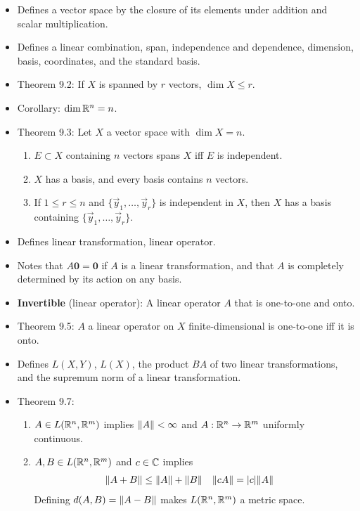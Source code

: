 \documentclass[../notes.tex]{subfiles}
\begin{document}
\begin{itemize}
    \item {}Defines a vector space by the closure of its elements under addition and scalar multiplication.
    \item Defines a linear combination, span, independence and dependence, dimension, basis, coordinates, and the standard basis.
    \item Theorem 9.2: If $X$ is spanned by $r$ vectors, $\dim X\leq r$.
    \item Corollary: $\dim\mathbb{R}^n=n$.
    \item Theorem 9.3: Let $X$ a vector space with $\dim X=n$.
    \begin{enumerate}[label={(\alph*)}]
        \item $E\subset X$ containing $n$ vectors spans $X$ iff $E$ is independent.
        \item $X$ has a basis, and every basis contains $n$ vectors.
        \item If $1\leq r\leq n$ and $\{\vec{y}_1,\dots,\vec{y}_r\}$ is independent in $X$, then $X$ has a basis containing $\{\vec{y}_1,\dots,\vec{y}_r\}$.
    \end{enumerate}
    \item Defines linear transformation, linear operator.
    \item Notes that $A\bm{0}=\bm{0}$ if $A$ is a linear transformation, and that $A$ is completely determined by its action on any basis.
    \item \textbf{Invertible} (linear operator): A linear operator $A$ that is one-to-one and onto.
    \item Theorem 9.5: $A$ a linear operator on $X$ finite-dimensional is one-to-one iff it is onto.
    \item Defines $L(X,Y)$, $L(X)$, the product $BA$ of two linear transformations, and the supremum norm of a linear transformation.
    \item Theorem 9.7:
    \begin{enumerate}[label={(\alph*)}]
        \item $A\in L(\mathbb{R}^n,\mathbb{R}^m)$ implies $\norm{A}<\infty$ and $A:\mathbb{R}^n\to\mathbb{R}^m$ uniformly continuous.
        \item $A,B\in L(\mathbb{R}^n,\mathbb{R}^m)$ and $c\in\mathbb{C}$ implies
        \begin{align*}
            \norm{A+B} &\leq \norm{A}+\norm{B}&
            \norm{cA} &= |c|\norm{A}
        \end{align*}
        Defining $d(A,B)=\norm{A-B}$ makes $L(\mathbb{R}^n,\mathbb{R}^m)$ a metric space.

\end{enumerate}
\end{itemize}
\end{document}
